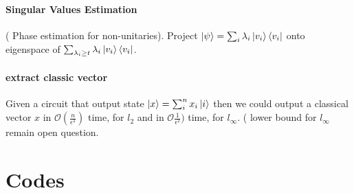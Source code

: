 \documentclass{article}
\begin{document}
\paragraph{Singular Values Estimation}
    ( Phase estimation for non-unitaries). Project \( \ket{\psi} = \sum_{i}\lambda_i\ket{v_i}\bra{v_i} \) onto eigenspace of \(  \sum_{\lambda_i \ge t }\lambda_i\ket{v_i}\bra{v_i} \). 

\paragraph{extract classic vector} 
    Given a circuit that output state \( \ket{x}= \sum_{i}^{n}x_i \ket{i} \) then we could output a classical vector \( x \) in \( \mathcal{O} ( \frac {n}{\epsilon^2} ) \) time, for \( l_2 \) and in \(  \mathcal{O}  \frac {1}{\epsilon^2} ) \) time, for \( l_{\infty} \). ( lower bound for \( l_{\infty} \) remain open question.     

\section{Codes}
\end{document}

